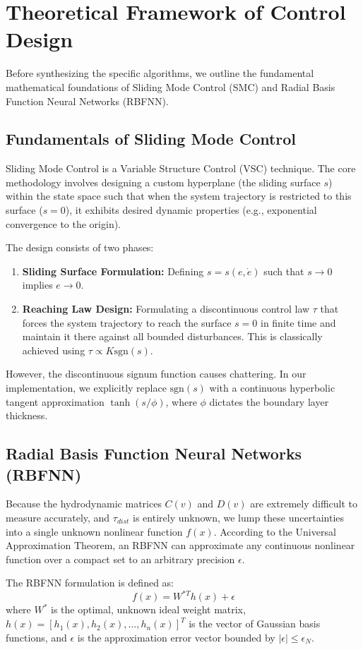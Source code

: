 \documentclass[conference]{IEEEtran}
\begin{document}
\section{Theoretical Framework of Control Design}
Before synthesizing the specific algorithms, we outline the fundamental mathematical foundations of Sliding Mode Control (SMC) and Radial Basis Function Neural Networks (RBFNN).

\subsection{Fundamentals of Sliding Mode Control}
Sliding Mode Control is a Variable Structure Control (VSC) technique. The core methodology involves designing a custom hyperplane (the sliding surface $s$) within the state space such that when the system trajectory is restricted to this surface ($s=0$), it exhibits desired dynamic properties (e.g., exponential convergence to the origin).

The design consists of two phases:
\begin{enumerate}
    \item \textbf{Sliding Surface Formulation:} Defining $s = s(e, \dot{e})$ such that $s \rightarrow 0$ implies $e \rightarrow 0$.
    \item \textbf{Reaching Law Design:} Formulating a discontinuous control law $\tau$ that forces the system trajectory to reach the surface $s=0$ in finite time and maintain it there against all bounded disturbances. This is classically achieved using $\tau \propto K \text{sgn}(s)$.
\end{enumerate}
However, the discontinuous signum function causes chattering. In our implementation, we explicitly replace $\text{sgn}(s)$ with a continuous hyperbolic tangent approximation $\tanh(s / \phi)$, where $\phi$ dictates the boundary layer thickness.

\subsection{Radial Basis Function Neural Networks (RBFNN)}
Because the hydrodynamic matrices $C(v)$ and $D(v)$ are extremely difficult to measure accurately, and $\tau_{dist}$ is entirely unknown, we lump these uncertainties into a single unknown nonlinear function $f(x)$. According to the Universal Approximation Theorem, an RBFNN can approximate any continuous nonlinear function over a compact set to an arbitrary precision $\epsilon$.

The RBFNN formulation is defined as:
\begin{equation}
f(x) = W^{*T} h(x) + \epsilon
\end{equation}
where $W^*$ is the optimal, unknown ideal weight matrix, $h(x) = [h_1(x), h_2(x), ..., h_n(x)]^T$ is the vector of Gaussian basis functions, and $\epsilon$ is the approximation error vector bounded by $|\epsilon| \leq \epsilon_N$.
\end{document}
